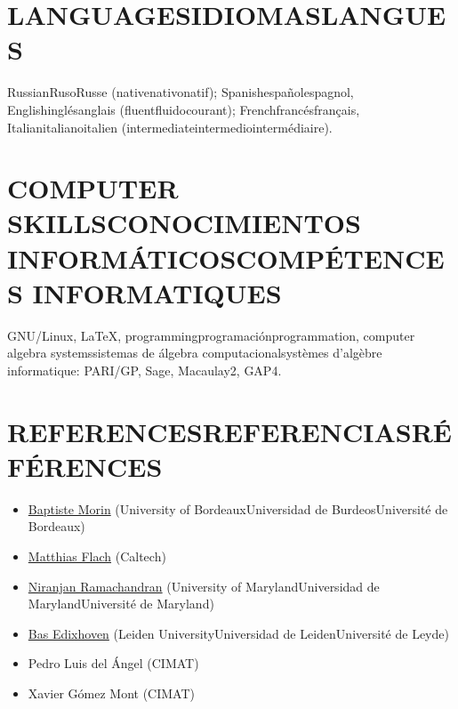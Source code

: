\documentclass{article}
\newcommand{\biling}[3]{\ifdefined\english#1\fi\ifdefined\spanish#2\fi\ifdefined\french#3\fi}
\begin{document}
{\color{RoyalBlue}\section*{\biling{LANGUAGES}{IDIOMAS}{LANGUES}}}

\biling{Russian}{Ruso}{Russe} (\biling{native}{nativo}{natif});
\biling{Spanish}{español}{espagnol},
\biling{English}{inglés}{anglais} (\biling{fluent}{fluido}{courant});
\biling{French}{francés}{français},
\biling{Italian}{italiano}{italien} (\biling{intermediate}{intermedio}{intermédiaire}).

\vspace{1em}

{\color{RoyalBlue}\section*{\biling{COMPUTER SKILLS}{CONOCIMIENTOS INFORMÁTICOS}{COMPÉTENCES INFORMATIQUES}}}

GNU/Linux,
LaTeX,
\biling{programming}{programación}{programmation},
\biling{computer algebra systems}{sistemas de álgebra computacional}{systèmes d'algèbre informatique}:
PARI/GP,
Sage,
Macaulay2,
GAP4.

\biling{\pagebreak}{\pagebreak}{\vspace{1em}}

{\color{RoyalBlue}\section*{\biling{REFERENCES}{REFERENCIAS}{RÉFÉRENCES}}}

\begin{itemize}
\item \href{https://www.math.u-bordeaux.fr/~bmorin/}{Baptiste Morin} (\biling{University of Bordeaux}{Universidad de Burdeos}{Université de Bordeaux})
\item \href{http://www.math.caltech.edu/~flach/}{Matthias Flach} (Caltech)
\item \href{https://www.math.umd.edu/~atma/}{Niranjan Ramachandran} (\biling{University of Maryland}{Universidad de Maryland}{Université de Maryland})
\item \href{https://www.math.leidenuniv.nl/~edix/}{Bas Edixhoven} (\biling{Leiden University}{Universidad de Leiden}{Université de Leyde})
\item Pedro Luis del Ángel (CIMAT)
\item Xavier Gómez Mont (CIMAT)
\end{itemize}
\end{document}
